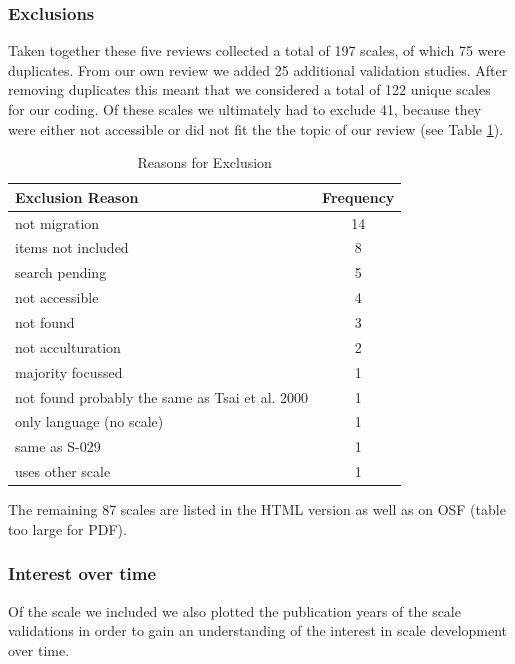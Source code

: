 \documentclass[
  american,
  man]{apa7}
\begin{document}
\hypertarget{exclusions}{%
\subsubsection{Exclusions}\label{exclusions}}

Taken together these five reviews collected a total of 197 scales, of which 75 were duplicates. From our own review we added 25 additional validation studies. After removing duplicates this meant that we considered a total of 122 unique scales for our coding. Of these scales we ultimately had to exclude 41, because they were either not accessible or did not fit the the topic of our review (see Table \ref{tab:ScalesExclusion}).

\begin{table}

\caption{\label{tab:ScalesExclusion}Reasons for Exclusion}
\begin{tabular}[t]{lc}
\toprule
Exclusion Reason & Frequency\\
\midrule
not migration & 14\\
items not included & 8\\
search pending & 5\\
not accessible & 4\\
not found & 3\\
\addlinespace
not acculturation & 2\\
majority focussed & 1\\
not found probably the same as Tsai et al. 2000 & 1\\
only language (no scale) & 1\\
same as S-029 & 1\\
\addlinespace
uses other scale & 1\\
\bottomrule
\end{tabular}
\end{table}

The remaining 87 scales are listed in the HTML version as well as on OSF (table too large for PDF).

\hypertarget{interest-over-time}{%
\subsubsection{Interest over time}\label{interest-over-time}}

Of the scale we included we also plotted the publication years of the scale validations in order to gain an understanding of the interest in scale development over time.
\end{document}
